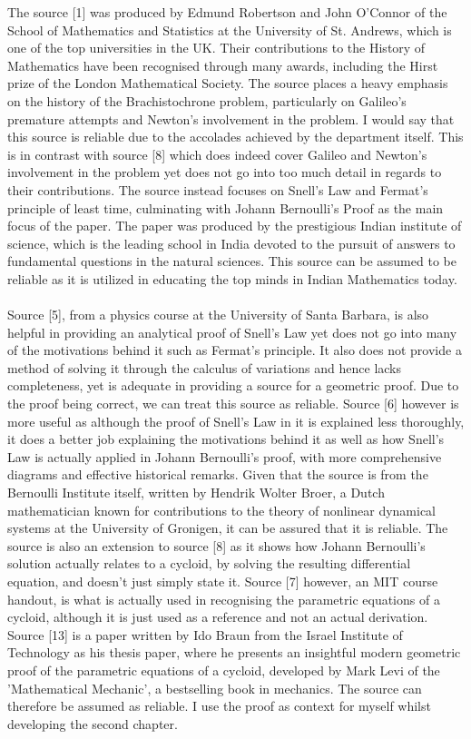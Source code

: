 \documentclass[12pt]{report}
\begin{document}
\begin{itemize}
    The source [1] was produced by Edmund Robertson and John O'Connor of the School of Mathematics and Statistics at the University of St. Andrews, which is one of the top universities in the UK. Their contributions to the History of Mathematics have been recognised through many awards, including the Hirst prize of the London Mathematical Society. The source places a heavy emphasis on the history of the Brachistochrone problem, particularly on Galileo's premature attempts and Newton's involvement in the problem. I would say that this source is reliable due to the accolades achieved by the department itself. This is in contrast with source [8] which does indeed cover Galileo and Newton's involvement in the problem yet does not go into too much detail in regards to their contributions. The source instead focuses on Snell's Law and Fermat's principle of least time, culminating with Johann Bernoulli's Proof as the main focus of the paper. The paper was produced by the prestigious Indian institute of science, which is the leading school in India devoted to the pursuit of answers to fundamental questions in the natural sciences. This source can be assumed to be reliable as it is utilized in educating the top minds in Indian Mathematics today.
    \\
    \\
    Source [5], from a physics course at the University of Santa Barbara, is also helpful in providing an analytical proof of Snell's Law yet does not go into many of the motivations behind it such as Fermat's principle. It also does not provide a method of solving it through the calculus of variations and hence lacks completeness, yet is adequate in providing a source for a geometric proof. Due to the proof being correct, we can treat this source as reliable. Source [6] however is more useful as although the proof of Snell's Law in it is explained less thoroughly, it does a better job explaining the motivations behind it as well as how Snell's Law is actually applied in Johann Bernoulli's proof, with more comprehensive diagrams and effective historical remarks. Given that the source is from the Bernoulli Institute itself, written by Hendrik Wolter Broer, a Dutch mathematician known for contributions to the theory of nonlinear dynamical systems at the University of Gronigen, it can be assured that it is reliable. The source is also an extension to source [8] as it shows how Johann Bernoulli's solution actually relates to a cycloid, by solving the resulting differential equation, and doesn't just simply state it. Source [7] however, an MIT course handout, is what is actually used in recognising the parametric equations of a cycloid, although it is just used as a reference and not an actual derivation. Source [13] is a paper written by Ido Braun from the Israel Institute of Technology as his thesis paper, where he presents an insightful modern geometric proof of the parametric equations of a cycloid, developed by Mark Levi of the 'Mathematical Mechanic', a bestselling book in mechanics. The source can therefore be assumed as reliable. I use the proof as context for myself whilst developing the second chapter.

\end{itemize}
\end{document}
